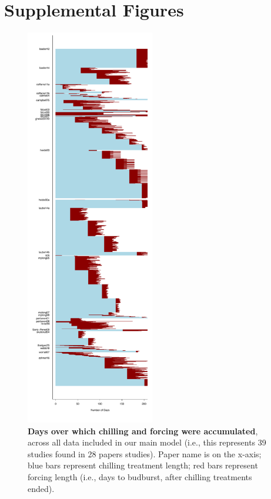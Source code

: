 \documentclass{article}
\begin{document}
\section* {Supplemental Figures}
\begin{figure}[hp!]
\centering
\noindent \includegraphics[width=0.50\textwidth]{..//..//analyses/bb_analysis/figures/chilldaysforcedays.pdf}
\caption{\textbf{Days over which chilling and forcing were accumulated}, across all data included in our main model (i.e., this represents 39 studies found in 28 papers studies). Paper name is on the x-axis; blue bars represent chilling treatment length; red bars represent forcing length (i.e., days to budburst, after chilling treatments ended).}
\label{fig:chillforceplot}
\end{figure}
\end{document}
